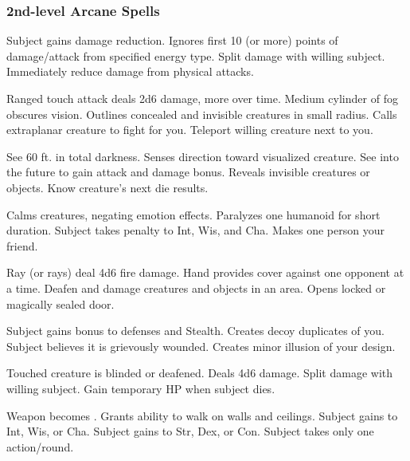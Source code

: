 \subsubsection{2nd-level Arcane Spells} 
\begin{swspelllist}
   Subject gains damage reduction.
   Ignores first 10 (or more) points of damage/attack from specified energy type.
   Split damage with willing subject.
   Immediately reduce damage from physical attacks.

   Ranged touch attack deals 2d6 damage, more over time.
   Medium cylinder of fog obscures vision.
   Outlines concealed and invisible creatures in small radius.
   Calls extraplanar creature to fight for you.
   Teleport willing creature next to you.

   See 60 ft. in total darkness.
   Senses direction toward visualized creature.
   See into the future to gain attack and damage bonus.
   Reveals invisible creatures or objects.
   Know creature's next die results.

   Calms creatures, negating emotion effects.
   Paralyzes one humanoid for short duration.
   Subject takes  penalty to Int, Wis, and Cha.
   Makes one person your friend.

   Ray (or rays) deal 4d6 fire damage.
   Hand provides cover against one opponent at a time.
   Deafen and damage creatures and objects in an area. 
   Opens locked or magically sealed door.

   Subject gains  bonus to defenses and Stealth.
   Creates decoy duplicates of you.
   Subject believes it is grievously wounded.
   Creates minor illusion of your design.

   Touched creature is blinded or deafened.
   Deals 4d6 damage.
   Split damage with willing subject.
   Gain temporary HP when subject dies.

   Weapon becomes .
   Grants ability to walk on walls and ceilings.
   Subject gains  to Int, Wis, or Cha.
   Subject gains  to Str, Dex, or Con.
   Subject takes only one action/round.
\end{swspelllist}

